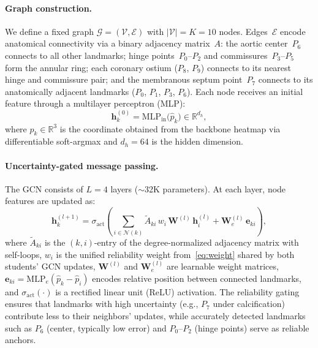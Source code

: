 \documentclass[conference]{IEEEtran}
\begin{document}
\paragraph{Graph construction.}
We define a fixed graph $\mathcal{G} = (\mathcal{V}, \mathcal{E})$ with $|\mathcal{V}| = K = 10$ nodes. Edges~$\mathcal{E}$ encode anatomical connectivity via a binary adjacency matrix~$A$: the aortic center~$P_6$ connects to all other landmarks; hinge points~$P_0$--$P_2$ and commissures~$P_3$--$P_5$ form the annular ring; each coronary ostium ($P_8$, $P_9$) connects to its nearest hinge and commissure pair; and the membranous septum point~$P_7$ connects to its anatomically adjacent landmarks ($P_0$, $P_1$, $P_3$, $P_6$). Each node receives an initial feature through a multilayer perceptron (MLP):
\begin{equation}
  \mathbf{h}_k^{(0)} = \mathrm{MLP}_{\mathrm{in}}\!\bigl(\hat{p}_k\bigr) \in \mathbb{R}^{d_h},
  \label{eq:node_init}
\end{equation}
where $\hat{p}_k \in \mathbb{R}^3$ is the coordinate obtained from the backbone heatmap via differentiable soft-argmax and $d_h = 64$ is the hidden dimension.

\paragraph{Uncertainty-gated message passing.}
The GCN consists of $L = 4$ layers (${\sim}$32K parameters). At each layer, node features are updated as:
\begin{equation}
  \mathbf{h}_k^{(l+1)} = \sigma_{\mathrm{act}}\!\left(
    \sum_{i \in \mathcal{N}(k)} \tilde{A}_{ki}\,w_i\,
      \mathbf{W}^{(l)}\,\mathbf{h}_i^{(l)}
    + \mathbf{W}_e^{(l)}\,\mathbf{e}_{ki}
  \right),
  \label{eq:gcn_mp}
\end{equation}
where $\tilde{A}_{ki}$ is the $(k,i)$-entry of the degree-normalized adjacency matrix with self-loops, $w_i$ is the unified reliability weight from~\eqref{eq:weight} shared by both students' GCN updates, $\mathbf{W}^{(l)}$ and $\mathbf{W}_e^{(l)}$ are learnable weight matrices, $\mathbf{e}_{ki} = \mathrm{MLP}_e(\hat{p}_k - \hat{p}_i)$ encodes relative position between connected landmarks, and $\sigma_{\mathrm{act}}(\cdot)$ is a rectified linear unit (ReLU) activation. The reliability gating ensures that landmarks with high uncertainty (e.g., $P_7$ under calcification) contribute less to their neighbors' updates, while accurately detected landmarks such as $P_6$ (center, typically low error) and $P_0$--$P_2$ (hinge points) serve as reliable anchors.
\end{document}
